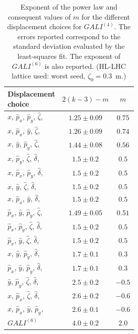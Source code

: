 \begin{table}
    \centering
    \begin{tabular}{l|cc}
        \toprule
        \makecell{Displacement\\choice} & $2(k-3)-m$ & $m$ \\
        \midrule
        $\hat{x}$, $\hat{p}_x$, $\hat{p}_y$, $\hat{\zeta}$, & $1.25 \pm 0.09$ & $0.75$ \\
        $\hat{x}$, $\hat{p}_x$, $\hat{y}$, $\hat{\zeta}$, & $1.26 \pm 0.09$ & $0.74$ \\
        $\hat{x}$, $\hat{y}$, $\hat{p}_y$, $\hat{\zeta}$, & $1.44 \pm 0.08$ & $0.56$ \\
        $\hat{x}$, $\hat{p}_y$, $\hat{\zeta}$, $\hat{\delta}$, & $1.5 \pm 0.2$ & $0.5$ \\
        $\hat{x}$, $\hat{p}_x$, $\hat{p}_y$, $\hat{\delta}$, & $1.5 \pm 0.2$ & $0.5$ \\
        $\hat{x}$, $\hat{y}$, $\hat{\zeta}$, $\hat{\delta}$, & $1.5 \pm 0.2$ & $0.5$ \\
        $\hat{x}$, $\hat{p}_x$, $\hat{y}$, $\hat{\delta}$, & $1.5 \pm 0.2$ & $0.5$ \\
        $\hat{p}_x$, $\hat{y}$, $\hat{p}_y$, $\hat{\zeta}$, & $1.49 \pm 0.05$ & $0.51$ \\
        $\hat{p}_x$, $\hat{p}_y$, $\hat{\zeta}$, $\hat{\delta}$, & $1.5 \pm 0.2$ & $0.5$ \\
        $\hat{p}_x$, $\hat{y}$, $\hat{\zeta}$, $\hat{\delta}$, & $1.5 \pm 0.2$ & $0.5$ \\
        $\hat{x}$, $\hat{y}$, $\hat{p}_y$, $\hat{\delta}$, & $1.7 \pm 0.1$ & $0.3$ \\
        $\hat{p}_x$, $\hat{y}$, $\hat{p}_y$, $\hat{\delta}$, & $1.7 \pm 0.1$ & $0.3$ \\
        $\hat{y}$, $\hat{p}_y$, $\hat{\zeta}$, $\hat{\delta}$, & $2.5 \pm 0.2$ & $-0.5$ \\
        $\hat{x}$, $\hat{p}_x$, $\hat{\zeta}$, $\hat{\delta}$, & $2.6 \pm 0.2$ & $-0.6$ \\
        $\hat{x}$, $\hat{p}_x$, $\hat{y}$, $\hat{p}_y$, & $2.6 \pm 0.1$ & $-0.6$ \\
        \midrule
        $GALI^{(6)}$ & $4.0 \pm 0.2$ &  2.0 \\   
        \bottomrule     
    \end{tabular}
    \caption{Exponent of the power law and consequent values of $m$ for the different displacement choices for $GALI^{(4)}$. The errors reported correspond to the standard deviation evaluated by the least-squares fit. The exponent of $GALI^{(6)}$ is also reported. (HL-LHC lattice used: worst seed, $\zeta_0=$\SI{0.3}{\meter}.)}
    \label{tab:gali4}
\end{table}

